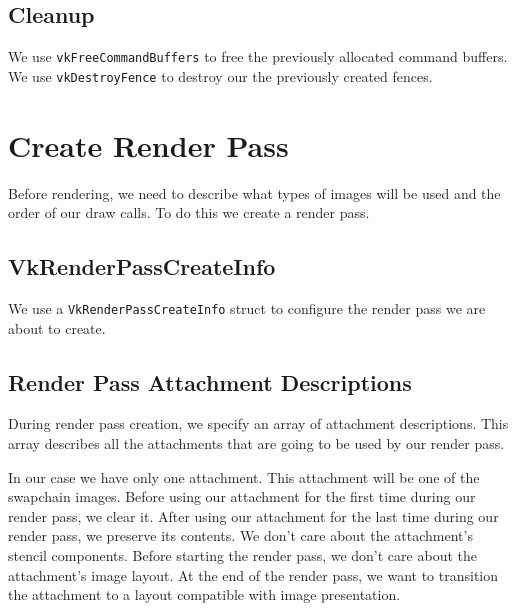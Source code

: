 \subsection{Cleanup}

We use \texttt{vkFreeCommandBuffers} to free the previously allocated command buffers.
We use \texttt{vkDestroyFence} to destroy our the previously created fences.

\section{Create Render Pass}

Before rendering, we need to describe what types of images will be used and the
order of our draw calls.
To do this we create a render pass.

\begin{minipage}{\linewidth}{\noindent}
    
\end{minipage}

\subsection{VkRenderPassCreateInfo}

We use a \texttt{VkRenderPassCreateInfo} struct to configure the render pass we
are about to create.

\begin{minipage}{\linewidth}{\noindent}
    
\end{minipage}

\subsection{Render Pass Attachment Descriptions}

During render pass creation, we specify an array of attachment descriptions.
This array describes all the attachments that are going to be used by our
render pass.

In our case we have only one attachment.
This attachment will be one of the swapchain images.
Before using our attachment for the first time during our render pass, we clear it.
After using our attachment for the last time during our render pass, we preserve
its contents.
We don't care about the attachment's stencil components.
Before starting the render pass, we don't care about the attachment's image layout.
At the end of the render pass, we want to transition the attachment to a layout
compatible with image presentation.

